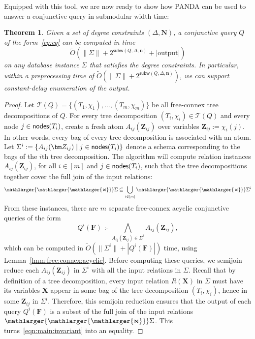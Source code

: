 \documentclass[10pt,a4paper]{article}
\newtheorem{theorem}{Theorem}[section]
\newcommand{\norm}[1]{\|#1\|}
\newcommand{\set}[1]{\{#1\}}                    %
\newcommand{\calT}{\mathcal T}
\newcommand{\cd}{\text{ :- }}
\newcommand{\bigjoin}{\mathlarger{\mathlarger{\mathlarger{\Join}}}}
\newcommand{\nodes}{\text{\sf nodes}}
\newcommand{\panda}{\textsf{PANDA}\xspace}
\newcommand{\subm}{\textsf{subw}}
\begin{document}
%
Equipped with this tool, we are now ready to show how \panda can be used to answer a
conjunctive query in submodular width time:


\begin{theorem}  Given a set of degree constraints
  $(\Delta, \bm N)$, a conjunctive query $Q$ of the form~\eqref{eq:cq} can be computed in
  time
  \[ \tilde O(\norm{\Sigma} + 2^{\subm(Q, \Delta, \bm n)} + |\text{output}|) \]
  on any database instance $\Sigma$ that satisfies the degree constraints.
  In particular, within a preprocessing time of $\tilde O(\norm{\Sigma} + 2^{\subm(Q, \Delta, \bm n)})$,
  we can support constant-delay enumeration of the output.
  \label{thm:algo:subw}
\end{theorem}

\begin{proof}
  Let $\calT(Q)=\set{(T_1,\chi_1), \ldots, (T_m, \chi_m)}$ be all free-connex tree
  decompositions of $Q$. For every tree decomposition $(T_i, \chi_i) \in \calT(Q)$ and every
  node $j \in \nodes(T_i)$, create a fresh atom $A_{ij}(\bm Z_{ij})$ over variables $\bm
  Z_{ij} := \chi_i(j)$. In other words, every bag of every tree decomposition is associated
  with an atom. Let $\Sigma^i := \{ A_{ij}(\bm Z_{ij}) \mid j \in \nodes(T_i)
  \}$ denote a schema corresponding to the bags of the $i$th tree decomposition. The
  algorithm will compute relation instances $A_{ij}(\bm Z_{ij})$, for all $i \in [m]$ and $j
  \in \nodes(T_i)$, such that the tree decompositions together cover the full join of the
  input relations:
  \begin{align}
    \bigjoin \Sigma \subseteq \bigcup_{i \in [m]} \bigjoin \Sigma^i
    \label{eqn:main:invariant}
  \end{align}
  From these instances, there are $m$ separate free-connex acyclic conjunctive
  queries of the form
  \[Q^i(\bm F) \cd \bigwedge_{A_{ij}(\bm Z_{ij}) \in \Sigma^i}A_{ij}(\bm Z_{ij}),\] which
  can be computed in $\tilde O(\norm{\Sigma^i} + |Q^i(\bm F)|)$ time, using
  Lemma~\ref{lmm:free:connex:acyclic}.
  Before computing these queries, we semijoin reduce each $A_{ij}(\bm Z_{ij})$ in $\Sigma^i$
  with all the input relations in $\Sigma$.
  Recall that by definition of a tree decomposition, every input relation $R(\bm X)$ in $\Sigma$
  must have its variables $\bm X$ appear in some bag of the tree decomposition $(T_i, \chi_i)$, hence
  in some $\bm Z_{ij}$ in $\Sigma^i$.
  Therefore, this semijoin reduction ensures that the output of each query $Q^i(\bm F)$ is a subset of the full join of the input relations $\bigjoin \Sigma$. This turns~\eqref{eqn:main:invariant} into an equality.


\end{proof}
\end{document}
